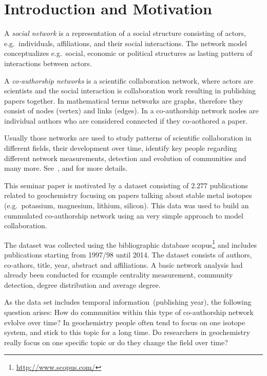 \documentclass[runningheads,a4paper]{llncs}
\begin{document}
\section{Introduction and Motivation}
A \emph{social network} is a representation of a social structure consisting of actors, e.g.~individuals, affiliations, and their social interactions.
The network model conceptualizes e.g.~social, economic or political structures as lasting pattern of interactions between actors.~\cite{wasserman1994social}

A \emph{co-authorship networks} is a scientific collaboration network, where actors are scientists and the social interaction is collaboration work resulting in publishing papers together.
In mathematical terms networks are graphs, therefore they consist of nodes (vertex) and links (edges).
In a co-authorship network nodes are individual authors who are considered connected if they co-aothored a paper.~\cite{newman2001structure}

Usually those networks are used to study patterns of scientific collaboration in different fields, their development over time, identify key people regarding different network measurements, detection and evolution of communities and many more. See~\cite{barabasi2002evolution}, \cite{newman2001structure} and \cite{newman2004coauthorship} for more details.

This seminar paper is motivated by a dataset consisting of $2.277$ publications related to geochemistry focusing on papers talking about stable metal isotopes (e.g.~potassium, magnesium, lithium, silicon). This data was used to build an cummulated co-authorship network using an very simple approach to model collaboration.

The dataset was collected using the bibliographic database scopus\footnote{\url{http://www.scopus.com/}} and includes publications starting from 1997/98 until 2014.
The dataset consists of authors, co-athors, title, year, abstract and affiliations.
A basic network analysis had already been conducted for example centrality measurement, community detection, degree distribution and average degree.

As the data set includes temporal information~(publishing year), the following question arises: How do communities within this type of co-authorship network evlolve over time? In geochemistry people often tend to focus on one isotope system, and stick to this topic for a long time. Do researchers in geochemistry really focus on one specific topic or do they change the field over time?
\end{document}
